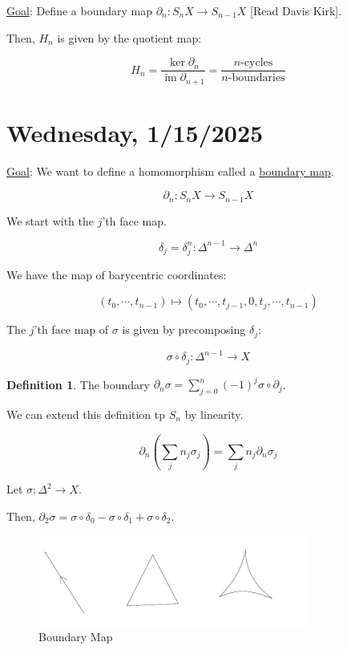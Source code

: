 \documentclass{article}
\theoremstyle{definition}
\newtheorem*{definition}{Definition}
\begin{document}
    \underline{Goal}: Define a boundary map \(\partial_n : S_n X \to S_{n-1} X\) [Read Davis Kirk].
    
    Then, \(H_n\) is given by the quotient map:

    \[
        H_n = \frac{\ker \partial_n}{\operatorname{im} \partial_{n+1}} = \frac{n \text{-cycles}}{n \text{-boundaries}}
    \]

    \section*{Wednesday, 1/15/2025}
    
    \underline{Goal}: We want to define a homomorphism called a \underline{boundary map}.

    \[
        \partial_n : S_n X \to S_{n-1} X
    \]

    We start with the \(j\)'th face map.

    \[
        \delta_j = \delta_j^n: \Delta^{n-1} \to \Delta^n
    \]

    We have the map of barycentric coordinates:

    \[
        (t_0, \cdots ,t_{n-1}) \mapsto (t_0, \cdots , t_{j-1}, 0, t_j, \cdots , t_{n-1})
    \]

    The \(j\)'th face map of \(\sigma\) is given by precomposing \(\delta_j\):

    \[
        \sigma \circ \delta_j : \Delta^{n-1} \to X
    \]

    \begin{definition}
        The boundary \(\partial_n \sigma = \sum_{j=0}^n (-1)^j \sigma \circ \partial_j\).

        We can extend this definition tp \(S_n\) by linearity.

        \[
            \partial_n \left( \sum_{j} n_j \sigma_j \right) = \sum_{j} n_j \partial_n \sigma_j
        \]
    \end{definition}

    Let \(\sigma: \Delta^2 \to X\).

    Then, \(\partial_2 \sigma = \sigma \circ \delta_0 - \sigma \circ \delta_1 + \sigma \circ \delta_2\).


    \begin{figure}[H]
        \centering
        \includegraphics[width=0.8\textwidth]{img/boundary.pdf}
        \caption{Boundary Map}
        \label{fig:boundary}
    \end{figure}
\end{document}
